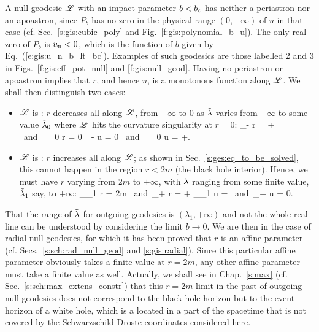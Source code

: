 A null geodesic $\mathscr{L}$ with an impact parameter $b < b_{\rm c}$ has neither
a periastron nor an apoastron, since $P_b$ has no zero in the physical range
$(0, +\infty)$ of $u$ in that
case (cf. Sec.~\ref{s:gis:cubic_poly} and Fig.~\ref{f:gis:polynomial_b_u}).
The only real zero of $P_b$ is $u_{\rm n}<0$, which is the function of $b$
given by Eq.~(\ref{e:gis:u_n_b_lt_bc}).
Examples of such geodesics are those labelled 2 and 3
in Figs.~\ref{f:gis:eff_pot_null} and \ref{f:gis:null_geod}.
Having no periastron or apoastron implies that $r$, and hence $u$, is a
monotonous function along $\mathscr{L}$.
We shall then distinguish two cases:
\begin{itemize}
\item $\mathscr{L}$ is : $r$ decreases all along $\mathscr{L}$, from $+\infty$ to $0$ as ${\tilde\lambda}$
varies from $-\infty$ to some value ${\tilde\lambda}_0$ where $\mathscr{L}$ hits the curvature
singularity at $r=0$:
\be
    \lim_{\tlamb\to -\infty} r = + \infty
    \ \mbox{and}\
    \lim_{\tlamb\to \tlamb_0} r = 0
    \quad \iff\quad
    \lim_{\tlamb\to -\infty} u = 0
    \ \mbox{and}\
    \lim_{\tlamb\to \tlamb_0} u = +\infty.
\ee
\item $\mathscr{L}$ is : $r$ increases all along $\mathscr{L}$; as shown in Sec.~\ref{s:ges:eq_to_be_solved}, this cannot happen in the region $r<2m$ (the black
hole interior). Hence, we must have $r$ varying from $2m$ to $+\infty$,
with ${\tilde\lambda}$ ranging from some finite value, ${\tilde\lambda}_1$ say, to $+\infty$:
\be
    \lim_{\tlamb\to \tlamb_1} r = 2m
    \ \mbox{and}\
    \lim_{\tlamb\to +\infty} r = +\infty
    \quad \iff\quad
    \lim_{\tlamb\to \tlamb_1} u = 
    \ \mbox{and}\
    \lim_{\tlamb\to +\infty} u = 0.
\ee
\end{itemize}
That the range of ${\tilde\lambda}$ for outgoing geodesics is $(\lambda_1, +\infty)$
and not the whole real line can be understood by considering the limit
$b\to 0$. We are then in the case of radial null geodesics, for which it has
been proved that $r$ is an affine parameter (cf. Secs.~\ref{s:sch:rad_null_geod}
and \ref{s:gis:radial}).
Since this particular affine parameter obviously takes a finite value at $r=2m$,
any other affine parameter must take a finite value as well.
Actually, we shall see in Chap.~\ref{s:max} (cf. Sec.~\ref{s:sch:max_extens_constr})
that this $r=2m$ limit in the
past of outgoing null geodesics does not correspond to the black hole horizon
but to the event horizon of a white hole, which is a located in a part of
the spacetime that is not covered by the Schwarzschild-Droste coordinates
considered here.


